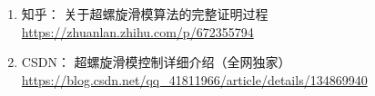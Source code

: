 

\begin{enumerate}
	\item 知乎： 关于超螺旋滑模算法的完整证明过程 \url{https://zhuanlan.zhihu.com/p/672355794}
	\item CSDN： 超螺旋滑模控制详细介绍（全网独家） \url{https://blog.csdn.net/qq_41811966/article/details/134869940}
\end{enumerate}